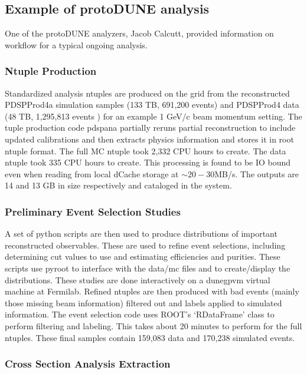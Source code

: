 \documentclass[../main-v1.tex]{subfiles}
\begin{document}
\subsection{Example of protoDUNE analysis }


One of the protoDUNE analyzers, Jacob Calcutt,  provided information on workflow for a typical ongoing analysis. 


\subsubsection{Ntuple Production}

Standardized analysis ntuples are produced on the grid from the reconstructed PDSPProd4a simulation samples (133 TB, 691,200 events)  and  PDSPProd4 data (48 TB, 1,295,813 events )  for an example 1 GeV/c beam momentum setting. The tuple production code pdspana  partially reruns partial reconstruction to include updated calibrations and then extracts physics information and stores it in root ntuple format. The full MC ntuple took 2,332 CPU hours to create. The data ntuple took 335 CPU hours to create. This processing is found to be IO bound even when reading from local dCache storage at $\sim 20-30 $MB/s. The outputs are 14 and 13 GB in size respectively and cataloged in the  system.  

\subsubsection{Preliminary Event Selection Studies}

A set of python scripts are then used to produce distributions of important reconstructed observables. These are used to refine event selections, including determining cut values to use and estimating efficiencies and purities. These scripts use pyroot to interface with the data/mc files and to create/display the distributions. These studies  are done interactively on a dunegpvm virtual machine at Fermilab.
Refined ntuples are then produced with bad events (mainly those missing beam information) filtered out and labels applied to simulated information. The event selection code uses ROOT’s `RDataFrame' class to perform filtering and labeling. This takes about 20 minutes to perform for the full ntuples.  These final samples contain 159,083 data and 170,238 simulated events. 

\subsubsection{Cross Section Analysis Extraction}
\end{document}
